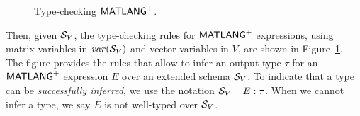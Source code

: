 \begin{figure}
  \caption{Type-checking $\mathsf{MATLANG}^{\sf +}$.}
  \label{fig:matlangplus-type-rules}
\end{figure}



Then, given $\mathcal{S}_V$, the type-checking rules for $\mathsf{MATLANG}^{\sf +}$ expressions, using matrix variables in $\operatorname{\mathit{var}}(\mathcal{S}_V)$ and vector variables in $V$,
are shown in Figure~\ref{fig:matlangplus-type-rules}.  The figure provides the rules
that allow to infer an output type $\tau$ for an $\mathsf{MATLANG}^{\sf +}$ expression $E$
over an extended schema $\mathcal{S}_V$. 
 To indicate that a type can be
\emph{successfully inferred}, we use the notation
$\mathcal{S}_V\vdash E:\tau$.  When we cannot infer a type, we say $E$
is not well-typed over $\mathcal{S}_V$.  


%


